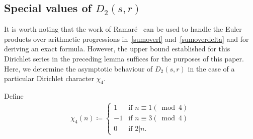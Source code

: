 \documentclass[12pt, oneside,reqno]{amsart}
\numberwithin{equation}{section}
\begin{document}
\subsection{Special values of $D_2(s,r)$}\label{section31}

It is worth noting that the work of Ramar\'{e}~\cite{ramare} can be used to handle the Euler products over arithmetic progressions in~\eqref{sumoverl} and~\eqref{sumoverdelta} and for deriving an exact formula. However, the upper bound established for this Dirichlet series in the preceding lemma suffices for the purposes of this paper. Here, we determine the asymptotic behaviour of $D_2(s,r)$ in the case of a particular Dirichlet character $\chi_4$.



\medskip

Define
\begin{align}\label{chi4definition}
\chi_4(n)
\coloneqq\begin{cases}
1 & \text{if $n\equiv 1(\bmod{4})$}\\
-1 & \text{if $n\equiv 3(\bmod{4})$}\\
0 &  \text{if $2|n$}.
\end{cases}
\end{align}
\end{document}
